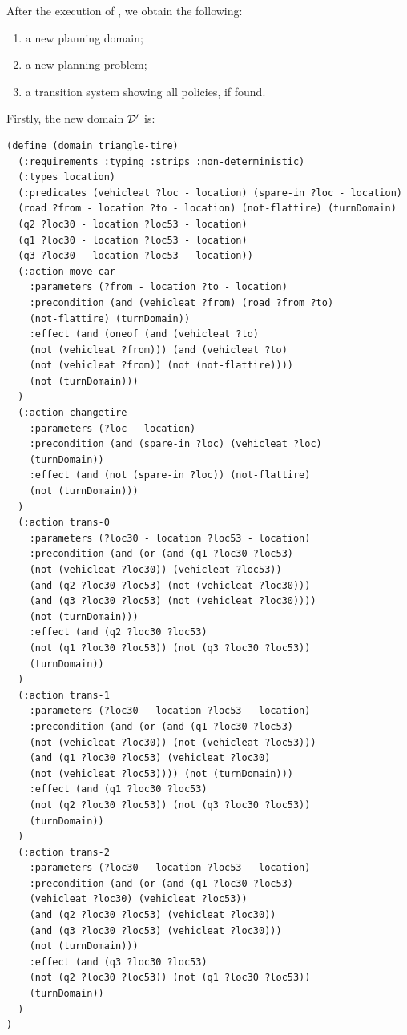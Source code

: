 After the execution of \FONDFOR, we obtain the following:
\begin{enumerate}
\item a new planning domain;
\item a new planning problem;
\item a transition system showing all policies, if found.
\end{enumerate}
Firstly, the new domain $\mathcal{D}'$ is:
\begin{lstlisting}[language=PDDL, escapechar=£]
(define (domain triangle-tire)
  (:requirements :typing :strips :non-deterministic)
  (:types location)
  (:predicates (vehicleat ?loc - location) (spare-in ?loc - location) 
  (road ?from - location ?to - location) (not-flattire) (turnDomain) 
  (q2 ?loc30 - location ?loc53 - location) 
  (q1 ?loc30 - location ?loc53 - location) 
  (q3 ?loc30 - location ?loc53 - location))
  (:action move-car
    :parameters (?from - location ?to - location)
    :precondition (and (vehicleat ?from) (road ?from ?to) 
    (not-flattire) (turnDomain))
    :effect (and (oneof (and (vehicleat ?to) 
    (not (vehicleat ?from))) (and (vehicleat ?to) 
    (not (vehicleat ?from)) (not (not-flattire)))) 
    (not (turnDomain)))
  )
  (:action changetire
    :parameters (?loc - location)
    :precondition (and (spare-in ?loc) (vehicleat ?loc) 
    (turnDomain))
    :effect (and (not (spare-in ?loc)) (not-flattire) 
    (not (turnDomain)))
  )
  (:action trans-0
    :parameters (?loc30 - location ?loc53 - location)
    :precondition (and (or (and (q1 ?loc30 ?loc53) 
    (not (vehicleat ?loc30)) (vehicleat ?loc53)) 
    (and (q2 ?loc30 ?loc53) (not (vehicleat ?loc30))) 
    (and (q3 ?loc30 ?loc53) (not (vehicleat ?loc30)))) 
    (not (turnDomain)))
    :effect (and (q2 ?loc30 ?loc53) 
    (not (q1 ?loc30 ?loc53)) (not (q3 ?loc30 ?loc53)) 
    (turnDomain))
  )
  (:action trans-1
    :parameters (?loc30 - location ?loc53 - location)
    :precondition (and (or (and (q1 ?loc30 ?loc53) 
    (not (vehicleat ?loc30)) (not (vehicleat ?loc53))) 
    (and (q1 ?loc30 ?loc53) (vehicleat ?loc30) 
    (not (vehicleat ?loc53)))) (not (turnDomain)))
    :effect (and (q1 ?loc30 ?loc53) 
    (not (q2 ?loc30 ?loc53)) (not (q3 ?loc30 ?loc53)) 
    (turnDomain))
  )
  (:action trans-2
    :parameters (?loc30 - location ?loc53 - location)
    :precondition (and (or (and (q1 ?loc30 ?loc53) 
    (vehicleat ?loc30) (vehicleat ?loc53)) 
    (and (q2 ?loc30 ?loc53) (vehicleat ?loc30)) 
    (and (q3 ?loc30 ?loc53) (vehicleat ?loc30))) 
    (not (turnDomain)))
    :effect (and (q3 ?loc30 ?loc53) 
    (not (q2 ?loc30 ?loc53)) (not (q1 ?loc30 ?loc53)) 
    (turnDomain))
  )
)
\end{lstlisting}

